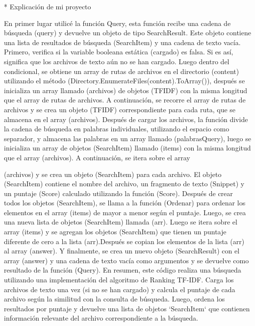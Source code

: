 \documentclass{beamer}
\begin{document}
\begin{frame}
 * Explicación de mi proyecto


En primer lugar utilicé la función Query, esta función recibe una cadena de búsqueda (query) y devuelve un objeto de tipo SearchResult. Este objeto contiene una lista de resultados de búsqueda (SearchItem) y una cadena de texto vacía.  Primero, verifica si la variable booleana estática (cargado) es falsa. Si es así, significa que los archivos de texto aún no se han cargado. Luego dentro del condicional, se obtiene un array de rutas de archivos en el directorio (content) utilizando el método (Directory.EnumerateFiles(content).ToArray()), después se inicializa un array llamado (archivos) de objetos (TFIDF) con la misma longitud que el array de rutas de archivos.  A continuación, se recorre el array de rutas de archivos y se crea un objeto (TFIDF) correspondiente para cada ruta, que se almacena en el array (archivos).  Después de cargar los archivos, la función divide la cadena de búsqueda en palabras individuales, utilizando el espacio como 
separador, y almacena las palabras en un array llamado (palabrasQuery), luego se inicializa un array de objetos 
(SearchItem) llamado (items) con la misma longitud que el array (archivos).  A continuación, se itera sobre el array 
\end{frame}
\begin{frame}
(archivos) y se crea un objeto (SearchItem) para cada archivo. El objeto (SearchItem) contiene el nombre del archivo, un fragmento de texto (Snippet) y un puntaje (Score) calculado utilizando la función (Score). Después de crear todos los objetos (SearchItem), se llama a la función (Ordenar) para ordenar los elementos en el array (items) de mayor a menor según el puntaje. Luego, se crea una nueva lista de objetos (SearchItem) llamada (arr). Luego  se itera sobre el array (items) y se agregan los objetos (SearchItem) que tienen un puntaje diferente de cero a la lista (arr).Después se copian los elementos de la lista (arr) al array (answer). Y finalmente, se crea un nuevo objeto (SearchResult) con el array (answer) y una cadena de texto vacía como argumentos y se devuelve como resultado de la función (Query). En resumen, este código realiza una búsqueda utilizando una implementación del algoritmo de Ranking TF-IDF. Carga los archivos de texto una vez (si no se han cargado) y calcula el puntaje de cada archivo según la similitud con la consulta de búsqueda. Luego, ordena los resultados por puntaje y devuelve una lista de objetos `SearchItem` que contienen información relevante del archivo correspondiente a la búsqueda.

\end{frame}
\end{document}
